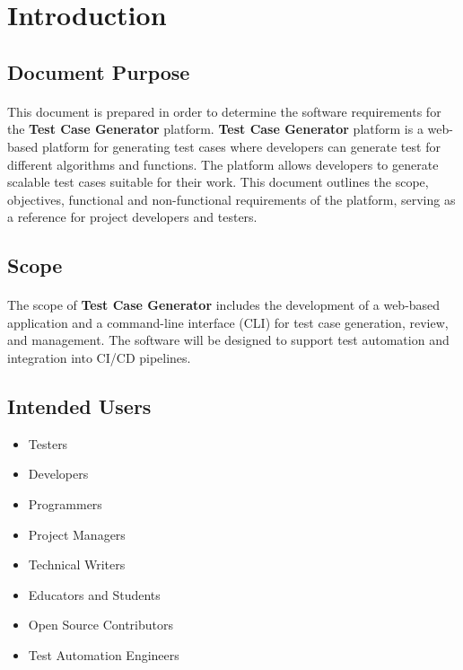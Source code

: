 \documentclass{article}
\begin{document}

\section{Introduction}
\subsection{Document Purpose}
\paragraph{}
This document is prepared in order to determine the software requirements for the
\textbf{Test Case Generator} platform. \textbf{Test Case Generator} platform is a
web-based platform for generating test cases where developers can generate test
for different algorithms and functions. The platform allows developers to generate
scalable test cases suitable for their work. This document outlines the scope,
objectives, functional and non-functional requirements of the platform, serving as
a reference for project developers and testers.

\subsection{Scope}
\paragraph{}
The scope of \textbf{Test Case Generator} includes the development of a web-based
application and a command-line interface (CLI) for test case generation, review,
and management. The software will be designed to support test automation and
integration into CI/CD pipelines.

\subsection{Intended Users}
\begin{itemize}
    \item Testers
    \item Developers
    \item Programmers
    \item Project Managers
    \item Technical Writers
    \item Educators and Students
    \item Open Source Contributors
    \item Test Automation Engineers
\end{itemize}
\end{document}
